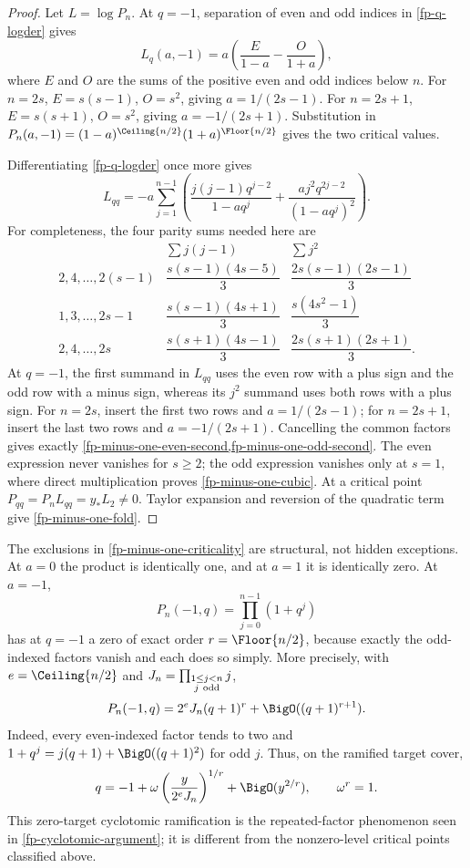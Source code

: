 \begin{proof}
Let \(L=\log P_n\).  At \(q=-1\), separation of even and odd indices in
\cref{fp-q-logder} gives
\[
 L_q(a,-1)=a\left(\frac{E}{1-a}-\frac{O}{1+a}\right),
\]
where \(E\) and \(O\) are the sums of the positive even and odd indices below
\(n\).  For \(n=2s\), \(E=s(s-1)\), \(O=s^2\), giving
\(a=1/(2s-1)\).  For \(n=2s+1\), \(E=s(s+1)\), \(O=s^2\), giving
\(a=-1/(2s+1)\).  Substitution in
\(P_n(a,-1)=(1-a)^{\Ceiling{n/2}}(1+a)^{\Floor{n/2}}\) gives the
two critical values.

Differentiating \cref{fp-q-logder} once more gives
\[
 L_{qq}=-a\sum_{j=1}^{n-1}\left(
 \frac{j(j-1)q^{j-2}}{1-aq^j}
 +\frac{aj^2q^{2j-2}}{(1-aq^j)^2}\right).
\]
For completeness, the four parity sums needed here are
\[
\begin{array}{c|cc}
 &\displaystyle\sum j(j-1)&\displaystyle\sum j^2\\ \hline
 2,4,\ldots,2(s-1)&
 \dfrac{s(s-1)(4s-5)}3&
 \dfrac{2s(s-1)(2s-1)}3\\[0.7em]
 1,3,\ldots,2s-1&
 \dfrac{s(s-1)(4s+1)}3&
 \dfrac{s(4s^2-1)}3\\[0.7em]
 2,4,\ldots,2s&
 \dfrac{s(s+1)(4s-1)}3&
 \dfrac{2s(s+1)(2s+1)}3 .
\end{array}
\]
At \(q=-1\), the first summand in \(L_{qq}\) uses the even row with a plus
sign and the odd row with a minus sign, whereas its \(j^2\) summand uses both
rows with a plus sign.  For \(n=2s\), insert the first two rows and
\(a=1/(2s-1)\); for \(n=2s+1\), insert the last two rows and
\(a=-1/(2s+1)\).  Cancelling the common factors gives exactly
\cref{fp-minus-one-even-second,fp-minus-one-odd-second}.  The even expression
never vanishes for \(s\geq2\); the odd expression vanishes only at \(s=1\),
where direct multiplication proves \cref{fp-minus-one-cubic}.
At a critical point \(P_{qq}=P_nL_{qq}=y_*L_2\ne0\).  Taylor expansion and
reversion of the quadratic term give \cref{fp-minus-one-fold}.
\end{proof}

The exclusions in \cref{fp-minus-one-criticality} are structural, not hidden
exceptions.  At \(a=0\) the product is identically one, and at \(a=1\) it is
identically zero.  At \(a=-1\),
\[
 P_n(-1,q)=\prod_{j=0}^{n-1}(1+q^j)
\]
has at \(q=-1\) a zero of exact order \(r=\Floor{n/2}\), because
exactly the odd-indexed factors vanish and each does so simply.  More
precisely, with \(e=\Ceiling{n/2}\) and
\(J_n=\prod_{\substack{1\leq j<n\\j\ {\rm odd}}}j\),
\begin{equation}
 P_n(-1,q)=2^eJ_n(q+1)^r+\BigO((q+1)^{r+1}).
 \label{fp-minus-one-zero-slice}
\end{equation}
Indeed, every even-indexed factor tends to two and
\(1+q^j=j(q+1)+\BigO((q+1)^2)\) for odd \(j\).  Thus, on the ramified target
cover,
\[
 q=-1+\omega\left(\frac{y}{2^eJ_n}\right)^{1/r}
 +\BigO(y^{2/r}),\qquad \omega^r=1.
\]
This zero-target cyclotomic ramification is the repeated-factor phenomenon
seen in \cref{fp-cyclotomic-argument}; it is different from the nonzero-level
critical points classified above.

